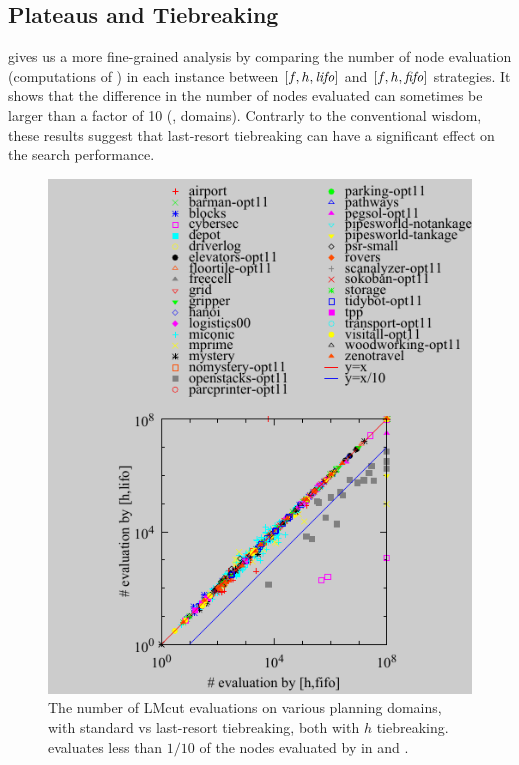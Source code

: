 \subsection{Plateaus and Tiebreaking}

 gives us a
more fine-grained analysis by comparing the number of node evaluation
(computations of \lmcut) in each instance between $[f,h,{\text{\textit{lifo}}}]$ and $[f,h,{\text{\textit{fifo}}}]$ strategies.
It shows that the difference in the number of nodes
evaluated can sometimes be larger than a factor of 10 (,  domains).
Contrarly to the conventional wisdom, 
these results suggest that last-resort tiebreaking can have a significant effect on
the search performance.

\begin{figure}[htbp]
 \centering {}
 \includegraphics{tables/aaai16-30min-5min-cut/aaai16prelim3/evaluated-lmcut_ff-lmcut_lf.pdf}
 \caption{The number of LMcut evaluations on various planning domains,
 with standard \fifo vs \lifo last-resort tiebreaking, both with $h$
 tiebreaking. \lifo evaluates  less than $1/10$ of the nodes evaluated
 by \fifo in  and . 
 }
 \label{fig:f-h-eval}
\end{figure}

